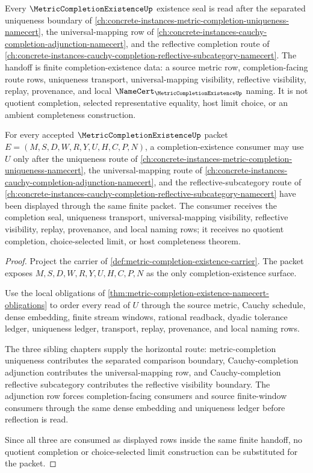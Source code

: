 Every $\MetricCompletionExistenceUp$ existence seal is read after the separated uniqueness boundary of \autoref{ch:concrete-instances-metric-completion-uniqueness-namecert}, the universal-mapping row of \autoref{ch:concrete-instances-cauchy-completion-adjunction-namecert}, and the reflective completion route of \autoref{ch:concrete-instances-cauchy-completion-reflective-subcategory-namecert}. The handoff is finite completion-existence data: a source metric row, completion-facing route rows, uniqueness transport, universal-mapping visibility, reflective visibility, replay, provenance, and local $\NameCert_{\MetricCompletionExistenceUp}$ naming. It is not quotient completion, selected representative equality, host limit choice, or an ambient completeness construction.

\begin{theorem}
\label{thm:metric-completion-existence-sibling-handoff}
For every accepted $\MetricCompletionExistenceUp$ packet $E=(M,S,D,W,R,Y,U,H,C,P,N)$, a completion-existence consumer may use $U$ only after the uniqueness route of \autoref{ch:concrete-instances-metric-completion-uniqueness-namecert}, the universal-mapping route of \autoref{ch:concrete-instances-cauchy-completion-adjunction-namecert}, and the reflective-subcategory route of \autoref{ch:concrete-instances-cauchy-completion-reflective-subcategory-namecert} have been displayed through the same finite packet. The consumer receives the completion seal, uniqueness transport, universal-mapping visibility, reflective visibility, replay, provenance, and local naming rows; it receives no quotient completion, choice-selected limit, or host completeness theorem.
\end{theorem}
\begin{proof}
Project the carrier of \autoref{def:metric-completion-existence-carrier}. The packet exposes $M,S,D,W,R,Y,U,H,C,P,N$ as the only completion-existence surface.

Use the local obligations of \autoref{thm:metric-completion-existence-namecert-obligations} to order every read of $U$ through the source metric, Cauchy schedule, dense embedding, finite stream windows, rational readback, dyadic tolerance ledger, uniqueness ledger, transport, replay, provenance, and local naming rows.

The three sibling chapters supply the horizontal route: metric-completion uniqueness contributes the separated comparison boundary, Cauchy-completion adjunction contributes the universal-mapping row, and Cauchy-completion reflective subcategory contributes the reflective visibility boundary. The adjunction row forces completion-facing consumers and source finite-window consumers through the same dense embedding and uniqueness ledger before reflection is read.

Since all three are consumed as displayed rows inside the same finite handoff, no quotient completion or choice-selected limit construction can be substituted for the packet.
\end{proof}
